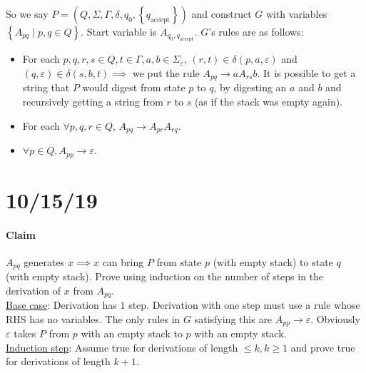 \documentclass[12 pt]{article}
\begin{document}
So we say $P = (Q, \Sigma, \Gamma, \delta, q_0,
\left\{q_{\text{accept}}\right\})$ and construct $G$ with variables
$\left\{A_{pq} \mid p, q \in Q\right\}$. Start variable is $A_{q_0,
  q_{\text{accept}}}$. $G$'s rules are as follows:
\begin{itemize}
\item For each $p,q,r,s \in Q, t \in \Gamma, a,b \in
  \Sigma_{\varepsilon}$, $(r,t) \in \delta(p, a, \varepsilon)$ and
  $(q,\varepsilon) \in \delta(s,b,t) \implies $ we put the rule
  $A_{pq} \to aA_{rs}b$. It is possible to get a string that $P$ would
  digest from state $p$ to $q$, by digesting an $a$ and $b$ and
  recursively getting a string from $r$ to $s$ (as if the stack was
  empty again).
\item For each $\forall p,q,r \in Q$, $A_{pq} \to A_{pr}A_{rq}$.
\item $\forall p \in Q, A_{pp} \to \varepsilon$.
\end{itemize}
\section{10/15/19}
\paragraph{Claim} $A_{pq}$ generates $x \implies x$ can bring $P$ from
state $p$ (with empty stack) to state $q$ (with empty stack). Prove
using induction on the number of steps in the derivation of $x$ from
$A_{pq}$.
\\ \underline{Base case}: Derivation has $1$ step. Derivation with one
step must use a rule whose RHS has no variables. The only rules in $G$
satisfying this are $A_{pp} \to \varepsilon$. Obviously $\varepsilon$
takes $P$ from $p$ with an empty stack to $p$ with an empty stack.
\\ \underline{Induction step}: Assume true for derivations of length
$\leq k, k \geq 1$ and prove true for derivations of length $k+1$.
\end{document}
